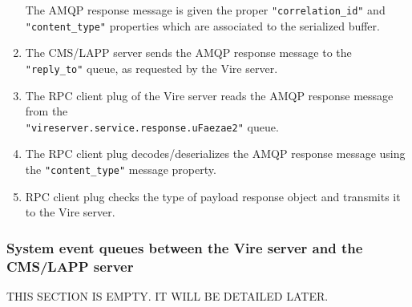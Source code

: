 \begin{enumerate}
  \vskip 10pt
  \begin{center}
    \scalebox{0.6}{}
  \end{center}

  The AMQP response message is given the proper \texttt{"correlation\_id"} and \texttt{"content\_type"}
  properties which are associated to the serialized buffer.

\item  The CMS/LAPP server sends the AMQP response message to the \texttt{"reply\_to"} queue,
  as requested by the Vire server.

  \vskip 10pt
  \begin{center}
    \scalebox{0.5}{}
  \end{center}

\item The  RPC client plug of  the Vire server reads  the AMQP response
  message from the \\
  \texttt{"vireserver.service.response.uFaezae2"} queue.

  \vskip 10pt
  \begin{center}
    \scalebox{0.5}{}
  \end{center}

\item The  RPC client plug decodes/deserializes the AMQP response
  message using the \texttt{"content\_type"} message property.

  \vskip 10pt
  \begin{center}
    \scalebox{0.5}{}
  \end{center}

\item  RPC client plug checks the type of payload response  object
  and transmits it to the Vire server.

  \vskip 10pt
  \begin{center}
    \scalebox{0.5}{}
  \end{center}

\end{enumerate}






\vfill
\afterpage{\clearpage}
\pagebreak

\subsubsection{System event queues between the Vire server and the CMS/LAPP server}

THIS SECTION IS EMPTY. IT WILL BE DETAILED LATER.

\vfill
\afterpage{\clearpage}
\pagebreak
